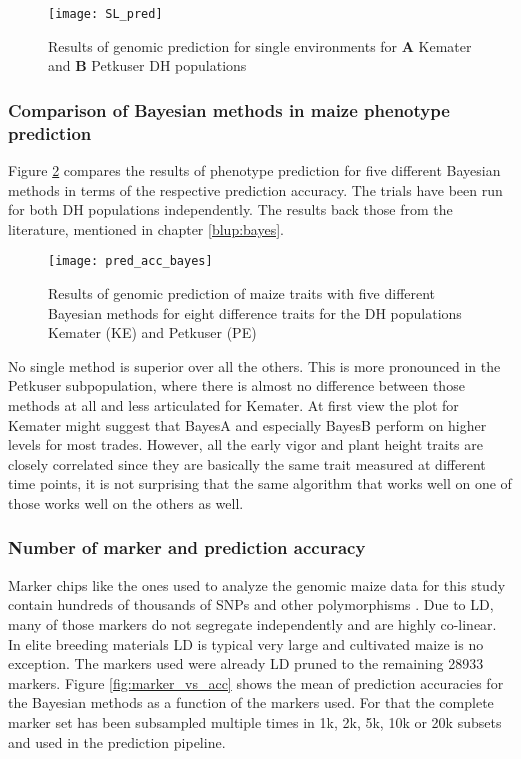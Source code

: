 \begin{figure}[H]
 \centering \texttt{[image: SL\_pred]}
 \decoRule
 \caption[Results of genomic prediction for single environments for Kemater and
 Petkuser DH populations]{Results of genomic prediction for single environments for
   \textbf{A} Kemater and \textbf{B} Petkuser DH populations}
\label{fig:sl_pred}
\end{figure}

\subsubsection{Comparison of Bayesian methods in maize phenotype prediction}

Figure \ref{fig:bayes_vs_acc} compares the results of phenotype prediction for five
different Bayesian methods in terms of the respective prediction accuracy. The trials have
been run for both DH populations independently. The results back those from the
literature, mentioned in chapter \ref{blup:bayes}.

\begin{figure}[H]
 \centering \texttt{[image: pred\_acc\_bayes]}
 \decoRule
 \caption[Results of genomic prediction of maize traits with five different Bayesian
 methods]{Results of genomic prediction of maize traits with five different Bayesian
   methods for eight difference traits for the DH populations Kemater (KE) and Petkuser
   (PE)}
\label{fig:bayes_vs_acc}
\end{figure}

No single method is superior over all the others. This is more pronounced in the Petkuser
subpopulation, where there is almost no difference between those methods at all and less
articulated for Kemater. At first view the plot for Kemater might suggest that BayesA and
especially BayesB perform on higher levels for most trades. However, all the early vigor
and plant height traits are closely correlated since they are basically the same trait
measured at different time points, it is not surprising that the same algorithm that works
well on one of those works well on the others as well.

\subsubsection{Number of marker and prediction accuracy}

Marker chips like the ones used to analyze the genomic maize data for this study contain
hundreds of thousands of SNPs and other polymorphisms \cite{unterseer2014powerful}. Due to
LD, many of those markers do not segregate independently and are highly co-linear. In
elite breeding materials LD is typical very large and cultivated maize is no
exception. The markers used were already LD pruned to the remaining 28933 markers. Figure
\ref{fig:marker_vs_acc} shows the mean of prediction accuracies for the Bayesian methods
as a function of the markers used. For that the complete marker set has been subsampled
multiple times in 1k, 2k, 5k, 10k or 20k subsets and used in the prediction pipeline.

